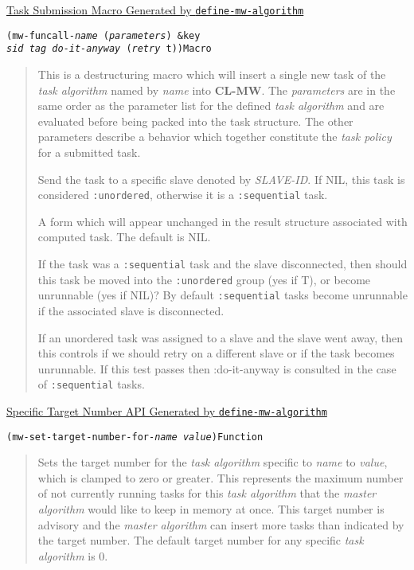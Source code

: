 \documentclass[titlepage,12pt]{book}
\newcommand{\xsmall}{\latexhtml{\small}{}}
\newcommand{\xnormalsize}{\latexhtml{\normalsize}{}}
\newcommand{\clmw}{\xsmall\textbf{CL-MW}\xnormalsize\xspace}
\newcommand{\ma}{\textit{master algorithm}\xspace}
\newcommand{\ta}{\textit{task algorithm}\xspace}
\newcommand{\tp}{\textit{task policy}\xspace}
\newcommand{\un}{\texttt{:unordered}\xspace}
\newcommand{\seq}{\texttt{:sequential}\xspace}
\newcommand{\macro}[1]{\xsmall\mbox{\uppercase{\texttt{#1}}}\xnormalsize\xspace}
\newcommand{\apiheader}[1]{\begin{center}\underline{#1}\end{center}}
\newcommand{\apifunc}[2]{\noindent\xsmall\texttt{(#1)}\hspace*{\fill}\xnormalsize\texttt{#2}}
\newenvironment{apientry}[2]
	{\apifunc{#1}{#2}\begin{quotation}}
	{\end{quotation}}
\begin{document}
\apiheader{Task Submission Macro Generated by \macro{define-mw-algorithm}}
\begin{apientry}
{mw-funcall-\textit{name} (\emph{parameters}) \&key\\
\indent \emph{sid} \emph{tag} \emph{do-it-anyway} (\emph{retry} t)}
{Macro}
This is a destructuring macro which will insert a single new task
of the \ta named by \emph{name}  into \clmw. The \emph{parameters}
are in the same order as the parameter list for the defined \ta and
are evaluated before being packed into the task structure. The other
parameters describe a behavior which together constitute the \tp for
a submitted task.

\begin{description}
\label{task-policy}
\item[sid \textit{SLAVE-ID}] Send the task to a specific slave denoted by 
					\textit{SLAVE-ID}.
                    If NIL, this task is considered \un, otherwise it is 
					a \seq task. 
\item[tag \textit{FORM}] A form which will appear unchanged in the result
			structure associated with computed task. The default is NIL.
\item[do-it-anyway {[T \textit{or} NIL]}] If the task was a 
							\seq task and the slave disconnected, then should
							this task be moved into the \un group (yes if T),
							or become unrunnable (yes if NIL)? By default \seq
							tasks become unrunnable if the associated slave is
							disconnected. 
\item[retry {[T \textit{or} NIL]}] If an unordered task was assigned to a 
			slave and the slave went away, then this controls if we should
			retry on a different slave or if the task becomes unrunnable. If
			this test passes then :do-it-anyway is consulted in the case of
			\seq tasks. 
\end{description}
\end{apientry}

\apiheader{Specific Target Number API Generated by \macro{define-mw-algorithm}}

\begin{apientry}
{mw-set-target-number-for-\textit{name} \emph{value}}
{Function}
Sets the target number for the \ta specific to \emph{name} to
\emph{value}, which is clamped to zero or greater.  This represents
the maximum number of not currently running tasks for this \ta that
the \ma would like to keep in memory at once. This target number is advisory
and the \ma can insert more tasks than indicated by the target number. The
default target number for any specific \ta is 0.  
\end{apientry}
\end{document}
